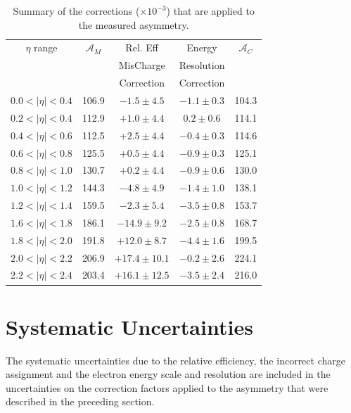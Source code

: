 \begin{table}[htbp]
  \begin{center}
    \begin{tabular}{ccccc}
\toprule
$\eta$ range & $\mathcal{A}_M$ & Rel. Eff & Energy & $\mathcal{A}_C$ \\
&                              & MisCharge & Resolution &  \\
&                              & Correction  & Correction & \\
\midrule
 $0.0<|\eta|<0.4$ & 106.9 &$- 1.5\pm 4.5$ & $-1.1\pm0.3$ & 104.3\\ 
 $0.2<|\eta|<0.4$ & 112.9 &$+ 1.0\pm 4.4$ & $ 0.2\pm0.6$ & 114.1\\ 
 $0.4<|\eta|<0.6$ & 112.5 &$+ 2.5\pm 4.4$ & $-0.4\pm0.3$ & 114.6\\
 $0.6<|\eta|<0.8$ & 125.5 &$+ 0.5\pm 4.4$ & $-0.9\pm0.3$ & 125.1\\ 
 $0.8<|\eta|<1.0$ & 130.7 &$+ 0.2\pm 4.4$ & $-0.9\pm0.6$ & 130.0\\ 
 $1.0<|\eta|<1.2$ & 144.3 &$- 4.8\pm 4.9$ & $-1.4\pm1.0$ & 138.1\\ 
 $1.2<|\eta|<1.4$ & 159.5 &$- 2.3\pm 5.4$ & $-3.5\pm0.8$ & 153.7\\ 
 $1.6<|\eta|<1.8$ & 186.1 &$-14.9\pm 9.2$ & $-2.5\pm0.8$ & 168.7\\
 $1.8<|\eta|<2.0$ & 191.8 &$+12.0\pm 8.7$ & $-4.4\pm1.6$ & 199.5\\
 $2.0<|\eta|<2.2$ & 206.9 &$+17.4\pm10.1$ & $-0.2\pm2.6$ & 224.1\\
 $2.2<|\eta|<2.4$ & 203.4 &$+16.1\pm12.5$ & $-3.5\pm2.4$ & 216.0\\
\bottomrule
    \end{tabular}
    \caption[Summary of the corrections that are applied to the measured
asymmetry.]{\label{tab:correctionfactors}Summary of the corrections ($\times
10^{-3}$) that are applied to the measured asymmetry\cite{bendavid2011electron}.}
  \end{center}
\end{table}


\section{Systematic Uncertainties}
The systematic uncertainties due to the relative efficiency, the incorrect
charge assignment and the electron energy scale and resolution are included in
the uncertainties on the correction factors applied to the asymmetry that were
described in the preceding section.

